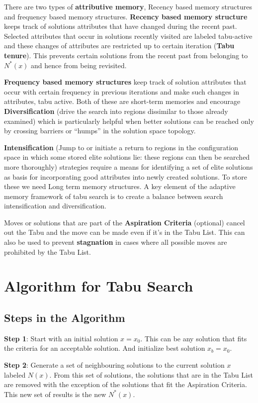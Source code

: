\documentclass[conference]{IEEEtran}
\begin{document}
There are two types of \textbf{attributive memory}, Recency based memory structures and frequency based memory structures. 
\textbf{Recency based memory structure} keeps track of solutions attributes that have changed during the recent past. Selected attributes that occur in solutions recently visited are labeled tabu-active and these changes of attributes are restricted up to certain iteration (\textbf{Tabu tenure}). This prevents certain solutions from the recent past from belonging to $N^{*}(x)$ and hence from being revisited.

\textbf{Frequency based memory structures} keep track of solution attributes that occur with certain frequency in previous iterations and make such changes in attributes, tabu active. Both of these are short-term memories and encourage \textbf{Diversification} (drive the search into regions dissimilar to those already examined) which is particularly helpful when better solutions can be reached only by crossing barriers or “humps” in the solution space topology.

\textbf{Intensification} (Jump to or initiate a return to regions in the configuration space in which some stored elite solutions lie: these regions can then be searched more thoroughly) strategies require a means for identifying a set of elite solutions as basis for incorporating good attributes into newly created solutions. To store these we need Long term memory structures.
A key element of the adaptive memory framework of tabu search is to create a balance between search intensification and diversification.

Moves or solutions that are part of the \textbf{Aspiration Criteria} (optional) cancel out the Tabu and the move can be made even if it’s in the Tabu List. This can also be used to prevent \textbf{stagnation} in cases where all possible moves are prohibited by the Tabu List.

\newpage
\section{\textbf{Algorithm for Tabu Search}}
\subsection{Steps in the Algorithm}
\textbf{Step 1}:
Start with an initial solution $x = x_{0}$. This can be any solution that fits the criteria for an acceptable solution. And initialize best solution $x_{b} = x_{0}$. 

\textbf{Step 2}:
Generate a set of neighbouring solutions to the current solution $x$ labeled $N(x)$. From this set of solutions, the solutions that are in the Tabu List are removed with the exception of the solutions that fit the Aspiration Criteria. This new set of results is the new $N^{*}(x)$.
\end{document}
